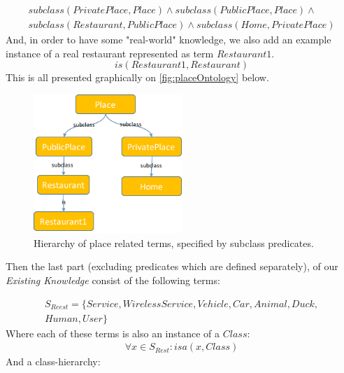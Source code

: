 \begin{equation}\label{as:kbPlaceSubclasses}
\begin{gathered}
    subclass(PrivatePlace,Place) \land subclass(PublicPlace,Place) \land \\
	subclass(Restaurant,PublicPlace) \land subclass(Home,PrivatePlace)
\end{gathered}
\end{equation}
And, in order to have some "real-world" knowledge, we also add an example 
instance of a real restaurant represented as term $Restaurant1$.
\begin{equation}\label{as:restaurant1}
	is(Restaurant1,Restaurant)
\end{equation}
This is all presented graphically on \autoref{fig:placeOntology} below.
\begin{figure}[H]
	\centering
		\includegraphics[width=0.5\textwidth]{figures/placeOntology.png}
	\caption{Hierarchy of place related terms, specified by subclass predicates.}
	\label{fig:placeOntology}
\end{figure}

Then the last part (excluding predicates which are defined separately),
of our \emph{Existing Knowledge} consist of the following terms:

\begin{equation}\label{set:otherTerms}
\begin{gathered}
S_{Reest} = \{Service,WirelessService,Vehicle,Car,Animal,Duck,\\
	Human,User\}
\end{gathered}
\end{equation}
Where each of these terms is also an instance of a $Class$:
\begin{equation}\label{set:restTermsClass}
\begin{gathered}
\forall x \in S_{Rest}: isa(x,Class)
\end{gathered}
\end{equation}
And a class-hierarchy:

